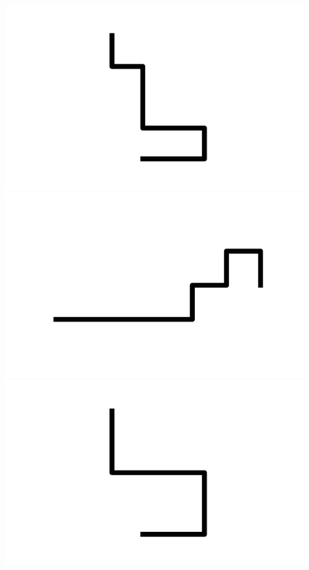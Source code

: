 \documentclass[]{report}
\begin{document}
\includegraphics[scale=.1]{pictures/21/state_cluster_shapes_340.pdf} 
\includegraphics[scale=.1]{pictures/21/state_cluster_shapes_341.pdf} 
\includegraphics[scale=.1]{pictures/21/state_cluster_shapes_342.pdf} 
\end{document}
